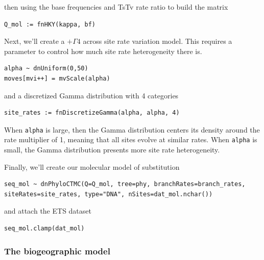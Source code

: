 then using the base frequencies and TsTv rate ratio to build the matrix

\begin{snugshade}
\begin{lstlisting}
Q_mol := fnHKY(kappa, bf)
\end{lstlisting}
\end{snugshade}

Next, we'll create a $+\Gamma4$ across site rate variation model.
This requires a parameter to control how much site rate heterogeneity there is.

\begin{snugshade}
\begin{lstlisting}
alpha ~ dnUniform(0,50)
moves[mvi++] = mvScale(alpha)
\end{lstlisting}
\end{snugshade}

and a discretized Gamma distribution with 4 categories

\begin{snugshade}
\begin{lstlisting}
site_rates := fnDiscretizeGamma(alpha, alpha, 4)
\end{lstlisting}
\end{snugshade}

When {\tt alpha} is large, then the Gamma distribution centers its density around the rate multiplier of 1, meaning that all sites evolve at similar rates.
When {\tt alpha} is small, the Gamma distribution presents more site rate heterogeneity.

Finally, we'll create our molecular model of substitution

\begin{snugshade}
\begin{lstlisting}
seq_mol ~ dnPhyloCTMC(Q=Q_mol, tree=phy, branchRates=branch_rates, siteRates=site_rates, type="DNA", nSites=dat_mol.nchar())
\end{lstlisting}
\end{snugshade}

and attach the ETS dataset

\begin{snugshade}
\begin{lstlisting}
seq_mol.clamp(dat_mol)
\end{lstlisting}
\end{snugshade}


\subsubsection{The biogeographic model}

